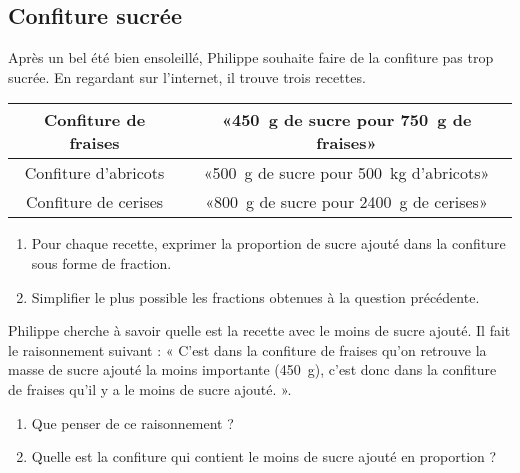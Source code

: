 
\subsection*{Confiture sucrée}

Après un bel été bien ensoleillé, Philippe souhaite faire de la confiture pas trop sucrée. En regardant sur l'internet, il trouve trois recettes.

\begin{center}
    \begin{tabular}[]{|c|c|}
        \hline
        Confiture de fraises&«\SI{450}{\gram} de sucre pour \SI{750}{\gram} de fraises» \\
        \hline
        Confiture d'abricots& «\SI{500}{\gram} de sucre pour \SI{500}{\kilo\gram} d'abricots» \\
        \hline
        Confiture de cerises&  «\SI{800}{\gram} de sucre pour \SI{2400}{\gram} de cerises» \\ 
        \hline
    \end{tabular}
\end{center}

\begin{enumerate}
    \item
Pour chaque recette, exprimer la proportion de sucre ajouté dans la confiture sous forme de fraction.
\item
    Simplifier le plus possible les fractions obtenues à la question précédente.
\end{enumerate}

Philippe cherche à savoir quelle est la recette avec le moins de sucre ajouté. Il fait le raisonnement suivant : « C'est dans la confiture de fraises qu'on retrouve la masse de sucre ajouté la moins importante (\SI{450}{\gram}), c'est donc dans la confiture de fraises qu'il y a le moins de sucre ajouté. ». 

\begin{enumerate}
    \item
Que penser de ce raisonnement ?
\item
Quelle est la confiture qui contient le moins de sucre ajouté en proportion ?
\end{enumerate}

